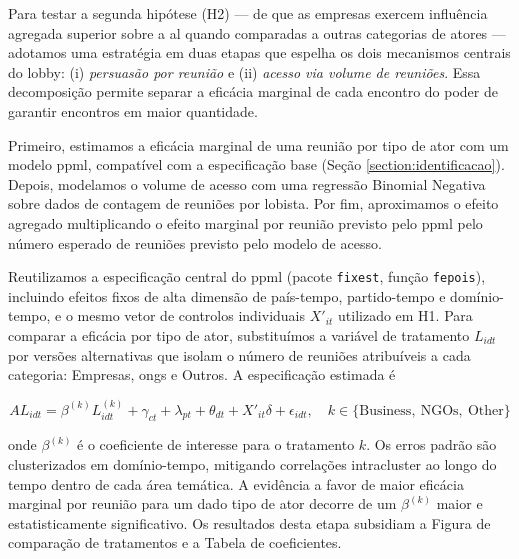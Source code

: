 
Para testar a segunda hipótese (H2) — de que as empresas exercem influência agregada superior sobre a \acrfull{al} quando comparadas a outras categorias de atores — adotamos uma estratégia em duas etapas que espelha os dois mecanismos centrais do lobby: (i) \textit{persuasão por reunião} e (ii) \textit{acesso via volume de reuniões}. Essa decomposição permite separar a eficácia marginal de cada encontro do poder de garantir encontros em maior quantidade.

Primeiro, estimamos a eficácia marginal de uma reunião por tipo de ator com um modelo \acrfull{ppml}, compatível com a especificação base (Seção \ref{section:identificacao}). Depois, modelamos o volume de acesso com uma regressão Binomial Negativa sobre dados de contagem de reuniões por lobista. Por fim, aproximamos o efeito agregado multiplicando o efeito marginal por reunião previsto pelo \acrshort{ppml} pelo número esperado de reuniões previsto pelo modelo de acesso.

Reutilizamos a especificação central do \acrshort{ppml} (pacote \texttt{fixest}, função \texttt{fepois}), incluindo efeitos fixos de alta dimensão de país-tempo, partido-tempo e domínio-tempo, e o mesmo vetor de controlos individuais $X'_{it}$ utilizado em H1. Para comparar a eficácia por tipo de ator, substituímos a variável de tratamento $L_{idt}$ por versões alternativas que isolam o número de reuniões atribuíveis a cada categoria: Empresas, \acrshort{ong}s e Outros. A especificação estimada é

\begin{equation}
    AL_{idt} = \beta^{(k)} L_{idt}^{(k)} + \gamma_{ct} + \lambda_{pt} + \theta_{dt} + X'_{it}\delta + \epsilon_{idt}, \quad k \in \{\text{Business},\ \text{NGOs},\ \text{Other}\}
\end{equation}

onde $\beta^{(k)}$ é o coeficiente de interesse para o tratamento $k$. Os erros padrão são clusterizados em domínio-tempo, mitigando correlações intracluster ao longo do tempo dentro de cada área temática. A evidência a favor de maior eficácia marginal por reunião para um dado tipo de ator decorre de um $\beta^{(k)}$ maior e estatisticamente significativo. Os resultados desta etapa subsidiam a Figura de comparação de tratamentos e a Tabela de coeficientes.

